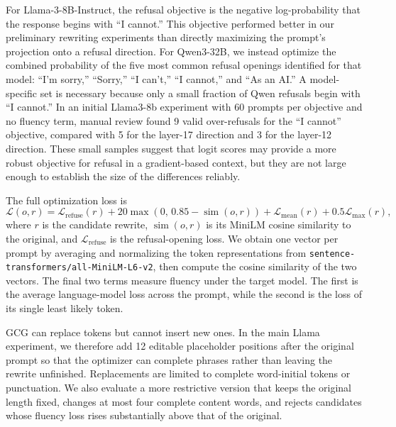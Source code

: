 \documentclass{article}
\begin{document}
For Llama-3-8B-Instruct, the refusal objective is the negative log-probability that the response begins with ``I cannot.'' This objective performed better in our preliminary rewriting experiments than directly maximizing the prompt's projection onto a refusal direction. For Qwen3-32B, we instead optimize the combined probability of the five most common refusal openings identified for that model: ``I'm sorry,'' ``Sorry,'' ``I can't,'' ``I cannot,'' and ``As an AI.'' A model-specific set is necessary because only a small fraction of Qwen refusals begin with ``I cannot.'' In an initial Llama3-8b experiment with 60 prompts per objective and no fluency term, manual review found 9 valid over-refusals for the ``I cannot'' objective, compared with 5 for the layer-17 direction and 3 for the layer-12 direction. These small samples suggest that logit scores may provide a more robust objective for refusal in a gradient-based context, but they are not large enough to establish the size of the differences reliably.

The full optimization loss is
\[
\mathcal{L}(o,r)
=
\mathcal{L}_{\mathrm{refuse}}(r)
+
20\max\!\left(0,\,0.85-\operatorname{sim}(o,r)\right)
+
\mathcal{L}_{\mathrm{mean}}(r)
+
0.5\mathcal{L}_{\mathrm{max}}(r),
\]
where \(r\) is the candidate rewrite, \(\operatorname{sim}(o,r)\) is its MiniLM cosine similarity to the original, and \(\mathcal{L}_{\mathrm{refuse}}\) is the refusal-opening loss. We obtain one vector per prompt by averaging and normalizing the token representations from \texttt{sentence-transformers/all-MiniLM-L6-v2}, then compute the cosine similarity of the two vectors. The final two terms measure fluency under the target model. The first is the average language-model loss across the prompt, while the second is the loss of its single least likely token.

GCG can replace tokens but cannot insert new ones. In the main Llama experiment, we therefore add 12 editable placeholder positions after the original prompt so that the optimizer can complete phrases rather than leaving the rewrite unfinished. Replacements are limited to complete word-initial tokens or punctuation. We also evaluate a more restrictive version that keeps the original length fixed, changes at most four complete content words, and rejects candidates whose fluency loss rises substantially above that of the original.
\end{document}

